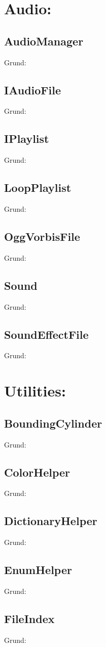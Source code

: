 \section{Audio:}
\subsection{AudioManager}
Grund:
\subsection{IAudioFile}
Grund:
\subsection{IPlaylist}
Grund:
\subsection{LoopPlaylist}
Grund:
\subsection{OggVorbisFile}
Grund:
\subsection{Sound}
Grund:
\subsection{SoundEffectFile}
Grund:

\section{Utilities:}
\subsection{BoundingCylinder}
Grund:
\subsection{ColorHelper}
Grund:
\subsection{DictionaryHelper}
Grund:
\subsection{EnumHelper}
Grund:
\subsection{FileIndex}
Grund:
